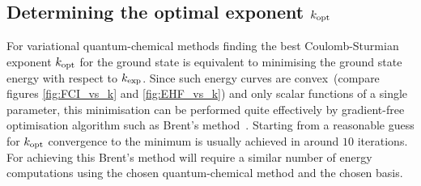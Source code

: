 %


%
%


%
%
\subsection{Determining the optimal exponent $k_\text{opt}$}
For variational quantum-chemical methods finding the best Coulomb-Sturmian
exponent $k_\text{opt}$ for the ground state is equivalent to minimising the ground state
energy with respect to $k_\text{exp}$.
Since such energy curves are
convex~(compare figures \ref{fig:FCI_vs_k} and \ref{fig:EHF_vs_k})
and only scalar functions of a single parameter,
this minimisation can be performed quite effectively
by gradient-free optimisation algorithm such as Brent's method~\cite{Brent1972}.
Starting from a reasonable guess for $k_\text{opt}$ convergence to the minimum
is usually achieved in around $10$ iterations.
For achieving this Brent's method will require a similar number of
energy computations using the chosen quantum-chemical method
and the chosen \CS basis.

